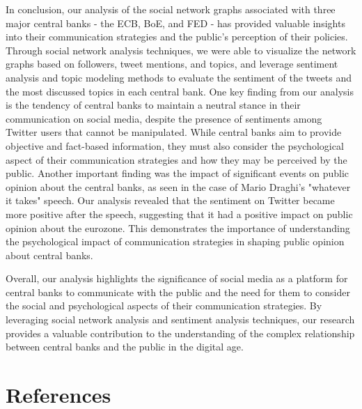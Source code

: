 \documentclass[fleqn,10pt]{SelfArx} %
\begin{document}
In conclusion, our analysis of the social network graphs associated with three major central banks - the ECB, BoE, and FED - has provided valuable insights into their communication strategies and the public's perception of their policies. Through social network analysis techniques, we were able to visualize the network graphs based on followers, tweet mentions, and topics, and leverage sentiment analysis and topic modeling methods to evaluate the sentiment of the tweets and the most discussed topics in each central bank. One key finding from our analysis is the tendency of central banks to maintain a neutral stance in their communication on social media, despite the presence of sentiments among Twitter users that cannot be manipulated. While central banks aim to provide objective and fact-based information, they must also consider the psychological aspect of their communication strategies and how they may be perceived by the public. Another important finding was the impact of significant events on public opinion about the central banks, as seen in the case of Mario Draghi's "whatever it takes" speech. Our analysis revealed that the sentiment on Twitter became more positive after the speech, suggesting that it had a positive impact on public opinion about the eurozone. This demonstrates the importance of understanding the psychological impact of communication strategies in shaping public opinion about central banks.

Overall, our analysis highlights the significance of social media as a platform for central banks to communicate with the public and the need for them to consider the social and psychological aspects of their communication strategies. By leveraging social network analysis and sentiment analysis techniques, our research provides a valuable contribution to the understanding of the complex relationship between central banks and the public in the digital age.

\section*{References} %

\end{document}

